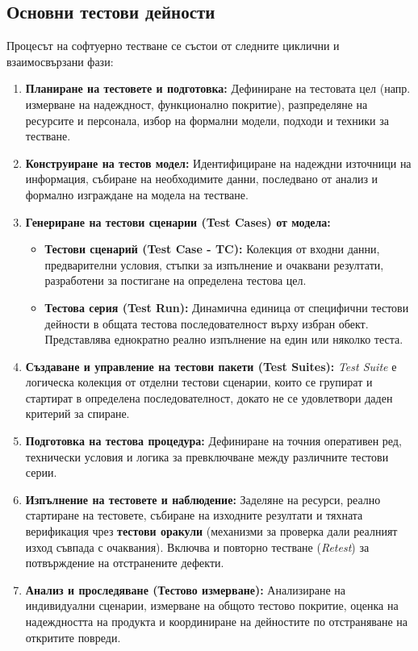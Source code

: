 \documentclass{scrartcl}
\begin{document}
\begin{FlushLeft}
\subsection{Основни тестови дейности}
Процесът на софтуерно тестване се състои от следните циклични и взаимосвързани фази:
\begin{enumerate}
    \item \textbf{Планиране на тестовете и подготовка:} Дефиниране на тестовата цел (напр. измерване на надеждност, функционално покритие), разпределяне на ресурсите и персонала, избор на формални модели, подходи и техники за тестване.
    \item \textbf{Конструиране на тестов модел:} Идентифициране на надеждни източници на информация, събиране на необходимите данни, последвано от анализ и формално изграждане на модела на тестване.
    \item \textbf{Генериране на тестови сценарии (Test Cases) от модела:} 
    \begin{itemize}
        \item \textbf{Тестови сценарий (Test Case - TC):} Колекция от входни данни, предварителни условия, стъпки за изпълнение и очаквани резултати, разработени за постигане на определена тестова цел.
        \item \textbf{Тестова серия (Test Run):} Динамична единица от специфични тестови дейности в общата тестова последователност върху избран обект. Представлява еднократно реално изпълнение на един или няколко теста.
    \end{itemize}
    \item \textbf{Създаване и управление на тестови пакети (Test Suites):} 
    \textit{Test Suite} е логическа колекция от отделни тестови сценарии, които се групират и стартират в определена последователност, докато не се удовлетвори даден критерий за спиране.
    \item \textbf{Подготовка на тестова процедура:} Дефиниране на точния оперативен ред, технически условия и логика за превключване между различните тестови серии.
    \item \textbf{Изпълнение на тестовете и наблюдение:} Заделяне на ресурси, реално стартиране на тестовете, събиране на изходните резултати и тяхната верификация чрез \textbf{тестови оракули} (механизми за проверка дали реалният изход съвпада с очаквания). Включва и повторно тестване (\textit{Retest}) за потвърждение на отстранените дефекти.
    \item \textbf{Анализ и проследяване (Тестово измерване):} Анализиране на индивидуални сценарии, измерване на общото тестово покритие, оценка на надеждността на продукта и координиране на дейностите по отстраняване на откритите повреди.
\end{enumerate}


\end{FlushLeft}
\end{document}
